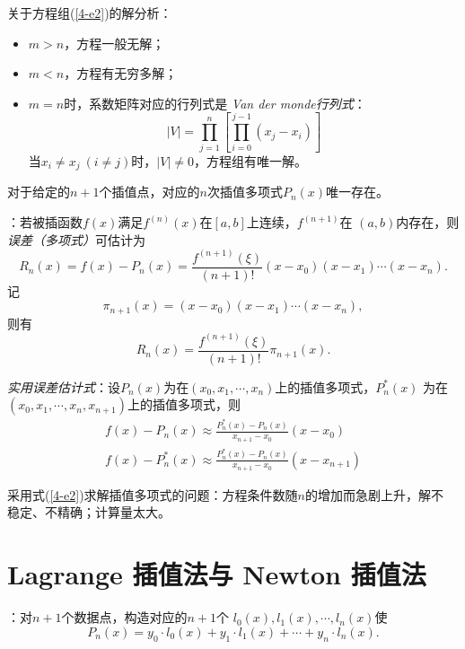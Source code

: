 \entry 关于方程组(\ref{4-e2})的解分析：
\begin{itemize}\tl
    \item $m>n$，方程一般无解；
    \item $m<n$，方程有无穷多解；
    \item $m=n$时，系数矩阵对应的行列式是 \emph{Van der monde行列式}：
    \begin{equation}
    |V|=\prod_{j=1}^n\left[\prod_{i=0}^{j-1}(x_j-x_i)\right]
    \end{equation}
    当$x_i\neq x_j\ (i\neq j)$时，$|V|\neq0$，方程组有唯一解。
\end{itemize}

\trm 对于给定的$n+1$个插值点，对应的$n$次插值多项式$P_n(x)$唯一存在。

\entry {}：若被插函数$f(x)$满足$f^{(n)}(x)$在$[a,b]$上连续，$f^{(n+1)}$在
$(a,b)$内存在，则\emph{误差（多项式）}可估计为
\begin{equation}
R_n(x)=f(x)-P_n(x)=\frac{f^{(n+1)}(\xi)}{(n+1)!}(x-x_0)(x-x_1)\cdots(x-x_n).
\end{equation}
记
\begin{equation}
\pi_{n+1}(x)=(x-x_0)(x-x_1)\cdots(x-x_n),
\end{equation}
则有
\begin{equation}
R_n(x)=\frac{f^{(n+1)}(\xi)}{(n+1)!}\pi_{n+1}(x).
\end{equation}

\entry \emph{实用误差估计式}：设$P_n(x)$为在$(x_0,x_1,\cdots,x_n)$上的插值多项式，$P_n^\ast(x)$
为在$(x_0,x_1,\cdots,x_n,x_{n+1})$上的插值多项式，则
\begin{gather}
f(x)-P_n(x)\approx\frac{P_n^\ast(x)-P_n(x)}{x_{n+1}-x_0}(x-x_0)\\
f(x)-P_n^\ast(x)\approx\frac{P_n^\ast(x)-P_n(x)}{x_{n+1}-x_0}(x-x_{n+1})
\end{gather}

\entry 采用式(\ref{4-e2})求解插值多项式的问题：方程条件数随$n$的增加而急剧上升，解不
稳定、不精确；计算量太大。

\section{Lagrange 插值法与 Newton 插值法}
\entry {}：对$n+1$个数据点，构造对应的$n+1$个 $l_0(x),l_1(x),\cdots,l_n(x)$使
\begin{equation}\label{4-e3}
P_n(x)=y_0\cdot l_0(x)+y_1\cdot l_1(x)+\cdots+y_n\cdot l_n(x).
\end{equation}

